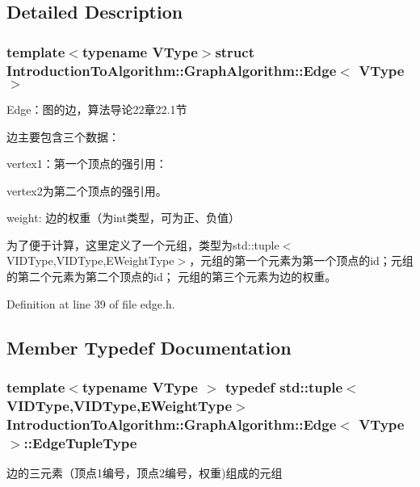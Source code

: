 \subsection{Detailed Description}
\subsubsection*{template$<$typename V\+Type$>$struct Introduction\+To\+Algorithm\+::\+Graph\+Algorithm\+::\+Edge$<$ V\+Type $>$}

Edge：图的边，算法导论22章22.1节 

边主要包含三个数据：


\begin{DoxyItemize}
\item {\ttfamily vertex1}：第一个顶点的强引用：
\item {\ttfamily vertex2}为第二个顶点的强引用。
\item {\ttfamily weight}\+: 边的权重（为int类型，可为正、负值）
\end{DoxyItemize}

为了便于计算，这里定义了一个元组，类型为{\ttfamily std\+::tuple$<$V\+I\+D\+Type,V\+I\+D\+Type,E\+Weight\+Type$>$}，元组的第一个元素为第一个顶点的{\ttfamily id}；元组的第二个元素为第二个顶点的{\ttfamily id}； 元组的第三个元素为边的权重。 

Definition at line 39 of file edge.\+h.



\subsection{Member Typedef Documentation}
\hypertarget{struct_introduction_to_algorithm_1_1_graph_algorithm_1_1_edge_a6cc12c05f7645ce74a6cff13b9ea932c}{}
\subsubsection[{Edge\+Tuple\+Type}]{\setlength{\rightskip}{0pt plus 5cm}template$<$typename V\+Type $>$ typedef std\+::tuple$<${\bf V\+I\+D\+Type},{\bf V\+I\+D\+Type},{\bf E\+Weight\+Type}$>$ {\bf Introduction\+To\+Algorithm\+::\+Graph\+Algorithm\+::\+Edge}$<$ V\+Type $>$\+::{\bf Edge\+Tuple\+Type}}\label{struct_introduction_to_algorithm_1_1_graph_algorithm_1_1_edge_a6cc12c05f7645ce74a6cff13b9ea932c}
边的三元素（顶点1编号，顶点2编号，权重)组成的元组 

